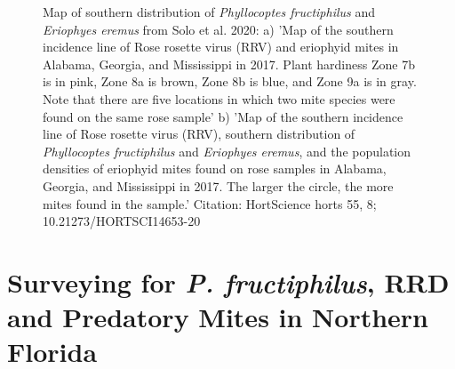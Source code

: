 \documentclass[12pt,final,CPage]{ufthesis}
\begin{document}
{\begin{figure}
  \caption[Map of southern distribution of \textit{Phyllocoptes fructiphilus} and \textit{Eriophyes eremus} from Solo et al. 2020]{Map of southern distribution of \textit{Phyllocoptes fructiphilus} and \textit{Eriophyes eremus} from Solo et al. 2020: a) 'Map of the southern incidence line of Rose rosette virus (RRV) and eriophyid mites in Alabama, Georgia, and Mississippi in 2017. Plant hardiness Zone 7b is in pink, Zone 8a is brown, Zone 8b is blue, and Zone 9a is in gray. Note that there are five locations in which two mite species were found on the same rose sample' b) 'Map of the southern incidence line of Rose rosette virus (RRV), southern distribution of \textit{Phyllocoptes fructiphilus} and \textit{Eriophyes eremus}, and the population densities of eriophyid mites found on rose samples in Alabama, Georgia, and Mississippi in 2017. The larger the circle, the more mites found in the sample.' Citation: HortScience horts 55, 8; 10.21273/HORTSCI14653-20}\label{fig:solo-maps}
  \end{figure}
  \hypertarget{intro-survey}{%
  \section{\texorpdfstring{Surveying for \emph{P. fructiphilus}, RRD and Predatory Mites in Northern Florida}{Surveying for P. fructiphilus, RRD and Predatory Mites in Northern Florida}}\label{intro-survey}}

}
\end{document}
